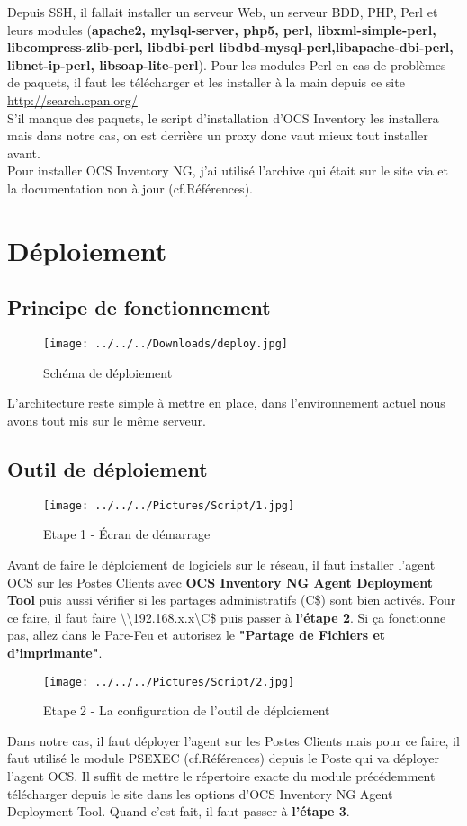 \documentclass[11pt,a4paper,oneside]{article}
\begin{document}
Depuis SSH, il fallait installer un serveur Web, un serveur BDD, PHP, Perl et leurs modules (\textbf{apache2, mylsql-server, php5, perl, libxml-simple-perl, libcompress-zlib-perl, libdbi-perl libdbd-mysql-perl,libapache-dbi-perl, libnet-ip-perl, libsoap-lite-perl}). Pour les modules Perl en cas de problèmes de paquets, il faut les télécharger et les installer à la main depuis ce site \url{http://search.cpan.org/} \\

S'il manque des paquets, le script d'installation d'OCS Inventory les installera mais dans notre cas, on est derrière un proxy donc vaut mieux tout installer avant. \\

Pour installer OCS Inventory NG, j'ai utilisé l'archive qui était sur le site via  et la documentation non à jour (cf.Références).
\newpage
\section{Déploiement}
\subsection{Principe de fonctionnement}
\begin{figure}[hbtp]
\texttt{[image: ../../../Downloads/deploy.jpg]}
\caption{Schéma de déploiement}
\end{figure}
L'architecture reste simple à mettre en place, dans l'environnement actuel nous avons tout mis sur le même serveur.
\subsection{Outil de déploiement}
\begin{figure}[hbtp]
\centering
\texttt{[image: ../../../Pictures/Script/1.jpg]}
\caption{Etape 1 - Écran de démarrage}
\end{figure}
Avant de faire le déploiement de logiciels sur le réseau, il faut installer l'agent OCS sur les Postes Clients avec \textbf{OCS Inventory NG Agent Deployment Tool} puis aussi vérifier si les partages administratifs (C\$) sont bien activés. Pour ce faire, il faut faire \textbackslash\textbackslash 192.168.x.x\textbackslash C\$
 puis passer à \textbf{l'étape 2}. Si ça fonctionne pas, allez dans le Pare-Feu et autorisez le \textbf{"Partage de Fichiers et d'imprimante"}.
\newpage

\begin{figure}[hbtp]
  \centering
  \texttt{[image: ../../../Pictures/Script/2.jpg]}
  \caption{Etape 2 - La configuration de l'outil de déploiement}
\end{figure} 
Dans notre cas, il faut déployer l'agent sur les Postes Clients mais pour ce faire, il faut utilisé le module PSEXEC (cf.Références) depuis le Poste qui va déployer l'agent OCS. Il suffit de mettre le répertoire exacte du module précédemment télécharger depuis le site dans les options d'OCS Inventory NG Agent Deployment Tool. Quand c'est fait, il faut passer à \textbf{l'étape 3}. \\
\end{document}
